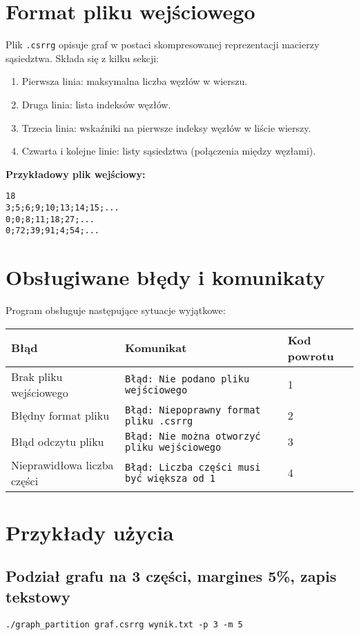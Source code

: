 \documentclass{article}
\begin{document}
\section{Format pliku wejściowego}
Plik \texttt{.csrrg} opisuje graf w postaci skompresowanej reprezentacji macierzy sąsiedztwa. Składa się z kilku sekcji:
\begin{enumerate}
    \item Pierwsza linia: maksymalna liczba węzłów w wierszu.
    \item Druga linia: lista indeksów węzłów.
    \item Trzecia linia: wskaźniki na pierwsze indeksy węzłów w liście wierszy.
    \item Czwarta i kolejne linie: listy sąsiedztwa (połączenia między węzłami).
\end{enumerate}

\textbf{Przykładowy plik wejściowy:}
\begin{lstlisting}
18
3;5;6;9;10;13;14;15;...
0;0;8;11;18;27;...
0;72;39;91;4;54;...
\end{lstlisting}

\section{Obsługiwane błędy i komunikaty}
Program obsługuje następujące sytuacje wyjątkowe:

\begin{tabular}{|l|l|l|}
\hline
\textbf{Błąd} & \textbf{Komunikat} & \textbf{Kod powrotu} \\
\hline
Brak pliku wejściowego & \texttt{Błąd: Nie podano pliku wejściowego} & 1 \\
\hline
Błędny format pliku & \texttt{Błąd: Niepoprawny format pliku .csrrg} & 2 \\
\hline
Błąd odczytu pliku & \texttt{Błąd: Nie można otworzyć pliku wejściowego} & 3 \\
\hline
Nieprawidłowa liczba części & \texttt{Błąd: Liczba części musi być większa od 1} & 4 \\
\hline
\end{tabular}

\section{Przykłady użycia}
\subsection{Podział grafu na 3 części, margines 5\%, zapis tekstowy}
\begin{verbatim}
./graph_partition graf.csrrg wynik.txt -p 3 -m 5
\end{verbatim}
\end{document}
